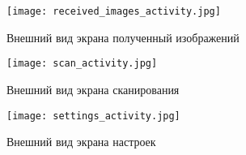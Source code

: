 \begin{figure}[ht]
    \centering                                                           
    \texttt{[image: received\_images\_activity.jpg]}
	\caption{Внешний вид экрана полученный изображений}
	\label{fig:received_images_activity}
\end{figure}

\begin{figure}[ht]
    \centering                                                           
    \texttt{[image: scan\_activity.jpg]}
	\caption{Внешний вид экрана сканирования}
	\label{fig:scan_activity}
\end{figure}

\begin{figure}[ht]
    \centering                                                           
    \texttt{[image: settings\_activity.jpg]}
	\caption{Внешний вид экрана настроек}
	\label{fig:settings_activity}
\end{figure}

